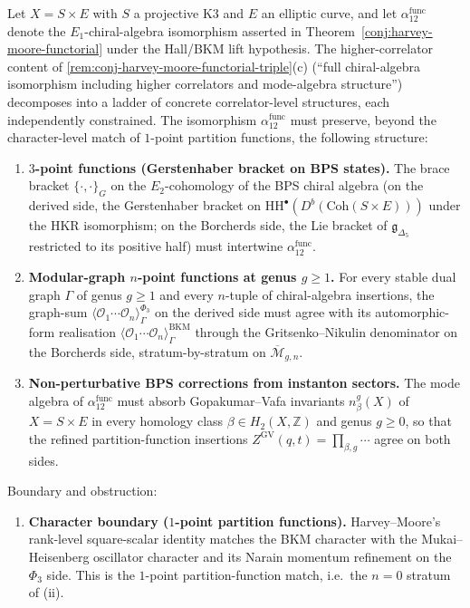 \begin{theorem}
\label{prop:harvey-moore-functorial-residual-structure}
Let $X = S \times E$ with $S$ a projective K3 and $E$ an elliptic curve, and let $\alpha_{12}^{\mathrm{func}}$ denote the $E_1$-chiral-algebra isomorphism asserted in Theorem~\ref{conj:harvey-moore-functorial} under the Hall/BKM lift hypothesis. The higher-correlator content of \ref{rem:conj-harvey-moore-functorial-triple}(c) (``full chiral-algebra isomorphism including higher correlators and mode-algebra structure'') decomposes into a ladder of concrete correlator-level structures, each independently constrained.
The isomorphism $\alpha_{12}^{\mathrm{func}}$ must preserve, beyond the character-level match of $1$-point partition functions, the following structure:
\begin{enumerate}[label=\textup{(\roman*)}]
 \item \textbf{$3$-point functions (Gerstenhaber bracket on BPS states).} The brace bracket $\{\cdot, \cdot\}_G$ on the $E_2$-cohomology of the BPS chiral algebra (on the derived side, the Gerstenhaber bracket on $\mathrm{HH}^\bullet(D^b(\mathrm{Coh}(S \times E)))$ under the HKR isomorphism; on the Borcherds side, the Lie bracket of $\mathfrak{g}_{\Delta_5}$ restricted to its positive half) must intertwine $\alpha_{12}^{\mathrm{func}}$.
 \item \textbf{Modular-graph $n$-point functions at genus $g \geq 1$.} For every stable dual graph $\Gamma$ of genus $g \geq 1$ and every $n$-tuple of chiral-algebra insertions, the graph-sum $\langle \mathcal{O}_1 \cdots \mathcal{O}_n \rangle_\Gamma^{\Phi_3}$ on the derived side must agree with its automorphic-form realisation $\langle \mathcal{O}_1 \cdots \mathcal{O}_n \rangle_\Gamma^{\mathrm{BKM}}$ through the Gritsenko--Nikulin denominator on the Borcherds side, stratum-by-stratum on $\overline{\mathcal{M}}_{g, n}$.
 \item \textbf{Non-perturbative BPS corrections from instanton sectors.} The mode algebra of $\alpha_{12}^{\mathrm{func}}$ must absorb Gopakumar--Vafa invariants $n^g_\beta(X)$ of $X = S \times E$ in every homology class $\beta \in H_2(X, \mathbb{Z})$ and genus $g \geq 0$, so that the refined partition-function insertions $Z^{\mathrm{GV}}(q, t) = \prod_{\beta, g} \cdots$ agree on both sides.
\end{enumerate}
Boundary and obstruction:
\begin{enumerate}[label=\textup{(\alph*)}]
 \item \textbf{Character boundary ($1$-point partition functions).} Harvey--Moore's rank-level square-scalar identity matches the BKM character with the Mukai--Heisenberg oscillator character and its Narain momentum refinement on the $\Phi_3$ side. This is the $1$-point partition-function match, i.e.\ the $n = 0$ stratum of (ii).

\end{enumerate}
\end{theorem}
